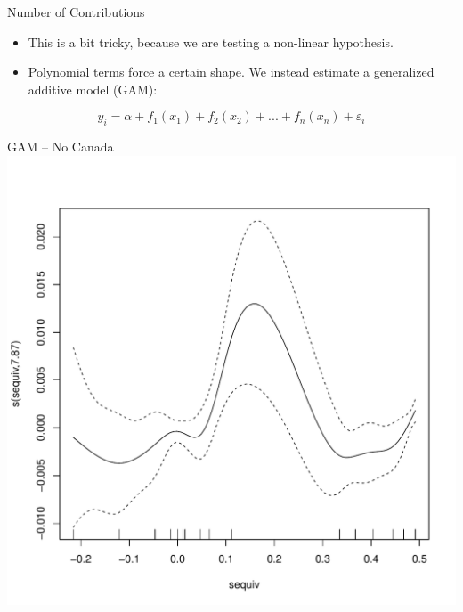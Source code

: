 \documentclass[11pt]{beamer}
\begin{document}
\begin{frame}{Number of Contributions}

  \begin{itemize}
    \item This is a bit tricky, because we are testing a non-linear hypothesis.
    \item Polynomial terms force a certain shape. We instead estimate a generalized additive model (GAM):
  \end{itemize}

  \begin{equation*}
    y_i = \alpha + f_1(x_1) + f_2(x_2) + ... + f_n(x_n) + \varepsilon_i
  \end{equation*}

\end{frame}

\begin{frame}{GAM -- No Canada}
  \centering
  \includegraphics[scale=0.5]{../figures/no_can_gam.pdf}
\end{frame}
\end{document}
